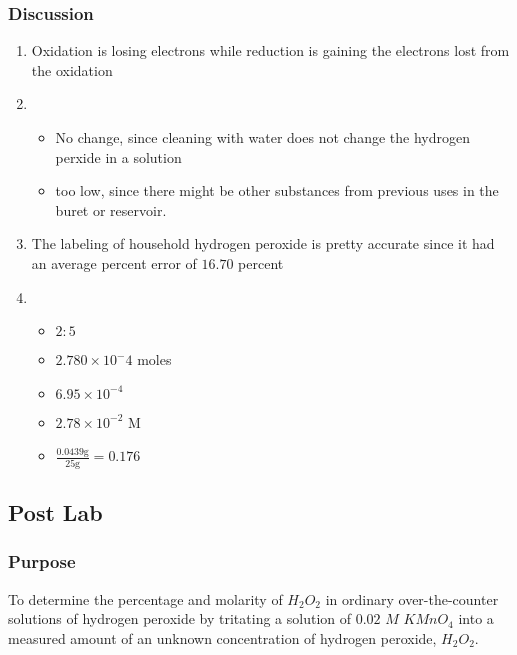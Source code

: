 \documentclass[
]{article}
\providecommand{\tightlist}{%
  \setlength{\itemsep}{0pt}\setlength{\parskip}{0pt}}
\begin{document}
\hypertarget{discussion}{%
\subsubsection{Discussion}\label{discussion}}

\begin{enumerate}
\def\labelenumi{\arabic{enumi}.}
\item
  Oxidation is losing electrons while reduction is gaining the electrons
  lost from the oxidation
\item
  \begin{itemize}
  \tightlist
  \item
    No change, since cleaning with water does not change the hydrogen
    perxide in a solution
  \item
    too low, since there might be other substances from previous uses in
    the buret or reservoir.
  \end{itemize}
\item
  The labeling of household hydrogen peroxide is pretty accurate since
  it had an average percent error of \(16.70\) percent
\item
  \begin{itemize}
  \tightlist
  \item
    \(2:5\)
  \item
    \(2.780 \times 10^-{4}\) moles
  \item
    \(6.95 \times 10^{-4}\)
  \item
    \(2.78 \times 10^{-2}\) M
  \item
    \(\frac{0.0439\text{g}}{25\text{g}} = \boxed{0.176}\)
  \end{itemize}
\end{enumerate}

\hypertarget{post-lab}{%
\subsection{Post Lab}\label{post-lab}}

\hypertarget{purpose-1}{%
\subsubsection{Purpose}\label{purpose-1}}

To determine the percentage and molarity of \(H_2O_2\) in ordinary
over-the-counter solutions of hydrogen peroxide by tritating a solution
of \(0.02\) \(M\) \(KMnO_4\) into a measured amount of an unknown
concentration of hydrogen peroxide, \(H_2O_2.\)
\end{document}
